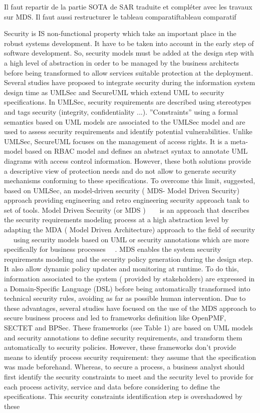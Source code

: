 \documentclass[runningheads,a4paper]{llncs}
\begin{document}
Il faut repartir de la partie SOTA de SAR traduite et compl\'eter avec les travaux sur MDS. Il faut aussi restructurer le tableau comparatiftableau comparatif



Security is IS non-functional property which take an important place in the robust systems development. It have to be taken into account in the early step of software development. So, security models must be added at the design step with a high level of abstraction in order to be managed by the business architects before being transformed to allow services suitable protection at the deployment.
Several studies have proposed to integrate security during the information system design time as UMLSec and SecureUML which extend UML to security specifications. In UMLSec, security requirements are described using stereotypes and tags security (integrity, confidentiality ...). ”Constraints” using a formal semantics based on UML models are associated to the UMLSec model and are used to assess security requirements and identify potential vulnerabilities. Unlike UMLSec, SecureUML focuses on the management of access rights. It is a meta-model based on RBAC model and defines an abstract syntax to annotate UML diagrams with access control information. However, these both solutions provide a descriptive view of protection needs and do not allow to generate security mechanisms conforming to these specifications. To overcome this limit, suggested, based on UMLSec, an model-driven security ( MDS- Model Driven Security) approach providing engineering and retro engineering security approach tank to set of tools. Model Driven Security (or MDS )  ~\cite{LS09} ~\cite{LZN14} is an approach that describes the security requirements modeling process at a high abstraction level by adapting the MDA ( Model Driven Architecture) approach to the field of security  ~\cite{BDL03}~\cite{CSB08} using security models based on UML or security annotations which are more specifically for business processes ~\cite{SSL09}~\cite{WMS09}. MDS enables the system security requirements modeling and the security policy generation during the design step. It also allow dynamic policy updates and monitoring at runtime. To do this, information associated to the system ( provided by stakeholders) are expressed in a Domain-Specific Language (DSL) before being automatically transformed into technical security rules, avoiding as far as possible human intervention. Due to these advantages, several studies have focused on the use of the MDS approach to secure business process and led to frameworks definition like OpenPMF, SECTET and BPSec. These frameworks (see Table 1) are based on UML models and security annotations to define security requirements, and transform them automatically to security policies. However, these frameworks don’t provide means to identify process security requirement: they assume that the specification was made beforehand. Whereas, to secure a process, a business analyst should first identify the security constraints to meet and the security level to provide for each process activity, service and data before considering to define the specifications. This security constraints identification step is overshadowed by these 
\end{document}
